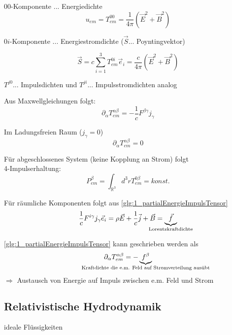 \documentclass[a4paper, 11pt]{article}
\numberwithin{equation}{section}
\begin{document}
$00$-Komponente $...$ Energiedichte
\begin{equation}
u_{em} = T_{em}^{00} = \dfrac{1}{4 \pi} \left( \vec{E}^2 + \vec{B}^2 \right)
\end{equation}

$0i$-Komponente $...$ Energiestromdichte ($\vec{S} ...$ Poyntingvektor)

\begin{equation}
\vec{S} = c \sum_{i = 1}^3 T_{em}^{0i} \vec{e}_i = \dfrac{c}{4 \pi} \left( \vec{E}^2 + \vec{B}^2 \right)
\end{equation}

$T^{j0} ...$ Impulsdichten und $T^{ji} ...$ Impulsstromdichten analog 

Aus Maxwellgleichungen folgt:
\begin{equation}\label{glg:1_partialEnergieImpulsTensor}
\partial_\alpha T^{\alpha \beta}_{em} = - \dfrac{1}{c} F^{\beta \gamma}j_\gamma
\end{equation}


Im Ladungsfreien Raum ($j_\gamma = 0$)
\begin{equation}
\partial_\alpha T_{em}^{\alpha \beta} = 0
\end{equation}

Für abgeschlossenes System (keine Kopplung an Strom) folgt \\4-Impulserhaltung:
\begin{equation}
P^\beta_{em} = \int_{\mathbb{R}^3} d^3r T_{em}^{0\beta} = konst.
\end{equation}

Für räumliche Komponenten folgt aus \ref{glg:1_partialEnergieImpulsTensor}
\begin{equation}
\dfrac{1}{c}F^{i \gamma} j_\gamma \vec{e}_i = \rho \vec{E} + \dfrac{1}{c} \vec{j} + \vec{B} = \underbrace{\vec{f}}_{\mathclap{\text{Lorentzkraftdichte}}}
\end{equation}

\ref{glg:1_partialEnergieImpulsTensor} kann geschrieben werden als
\begin{equation}\label{glg:1_KraftdichteEMFeld}
\partial_\alpha T^{\alpha \beta}_{em} = - \underbrace{f^\beta}_{\mathclap{\text{Kraftdichte die e.m. Feld auf Stromverteilung ausübt}}}
\end{equation}
$\Rightarrow$ Austausch von Energie auf Impuls zwischen e.m. Feld und Strom



\subsection*{Relativistische Hydrodynamik}
ideale Flüssigkeiten
\end{document}
